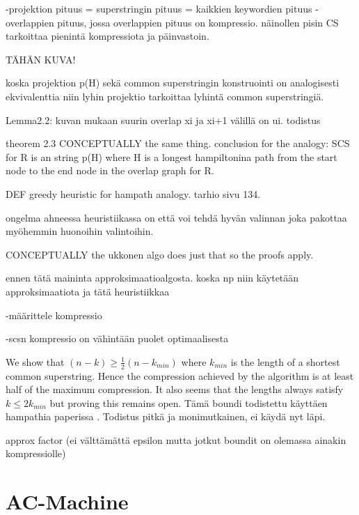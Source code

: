 \documentclass[english,twoside,censored,csm,algorithms-track-2020]{HYthesisML}
\theoremstyle{plain}
\theoremstyle{definition}
\begin{document}
  -projektion pituus = superstringin pituus = kaikkien keywordien pituus - overlappien pituus, jossa
  overlappien pituus on kompressio. näinollen pisin CS tarkoittaa pienintä kompressiota ja päinvastoin.

  TÄHÄN KUVA!

  koska projektion p(H) sekä common superstringin konstruointi on analogisesti ekvivalenttia niin lyhin
  projektio tarkoittaa lyhintä common superstringiä.

  Lemma2.2: kuvan mukaan suurin overlap xi ja xi+1 välillä on ui.
  todistus


  theorem 2.3 CONCEPTUALLY the same thing.
  conclusion for the analogy: SCS for R is an string p(H) where H is a longest hampiltonina path from the start node to the end node in the overlap graph for R.

  DEF greedy heuristic for hampath analogy. tarhio sivu 134.

  ongelma ahneessa heuristiikassa on että voi tehdä hyvän valinnan joka pakottaa myöhemmin huonoihin valintoihin.

  CONCEPTUALLY the ukkonen algo does just that so the proofs apply.



  
ennen tätä maininta approksimaatioalgosta. koska np niin käytetään approksimaatiota ja tätä heuristiikkaa


-määrittele kompressio

-scsn kompressio on vähintään puolet optimaalisesta \citep{Tarhio88}


We show that $(n-k)\geq \frac{1}{2}(n-k_{min})$ where  $k_{min}$ is the length of a shortest common superstring. Hence the compression achieved by the algorithm is at least half of the maximum compression. It also seems that the lengths always satisfy $k\leq 2k_{min}$ but proving this remains open.
Tämä boundi todistettu käyttäen hampathia paperissa \citep{Tarhio88}.
Todistus pitkä ja monimutkainen, ei käydä nyt läpi. 

  approx factor (ei välttämättä epsilon mutta jotkut boundit on olemassa ainakin kompressiolle)



\section{AC-Machine}

\end{document}
